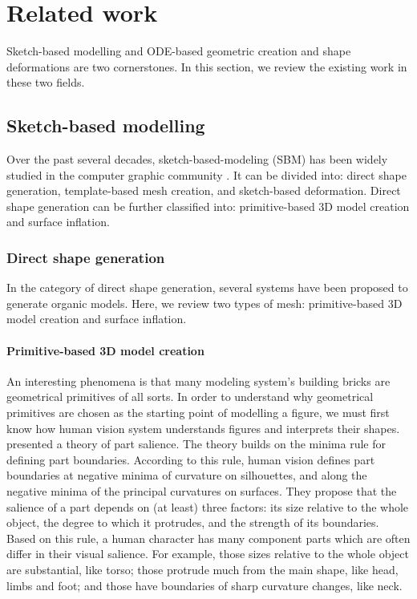 \documentclass[runningheads]{llncs}
\begin{document}
\section{Related work}\label{related work}
Sketch-based modelling and ODE-based geometric creation and shape deformations are two cornerstones. In this section, we review the existing work in these two fields.\\

\subsection{Sketch-based modelling}
Over the past several decades, sketch-based-modeling (SBM) has been widely studied in the computer graphic community \cite{olsen2009sketch}. It can be divided into: direct shape generation, template-based mesh creation, and sketch-based deformation. Direct shape generation can be further classified into: primitive-based 3D model creation and surface inflation.

\subsubsection{Direct shape generation} In the category of direct shape generation, several systems have been proposed to generate organic models. Here, we review two types of mesh: primitive-based 3D model creation and surface inflation.


\paragraph{Primitive-based 3D model creation}
An interesting phenomena is that many modeling system's building bricks are geometrical primitives of all sorts. In order to understand why geometrical primitives are chosen as the starting point of modelling a figure, we must first know how human vision system understands figures and interprets their shapes. \cite{hoffman1997salience} presented a theory of part salience. The theory builds on the minima rule for defining part boundaries. According to this rule, human vision defines part boundaries at negative minima of curvature on silhouettes, and along the negative minima of the principal curvatures on surfaces. They propose that the salience of a part depends on (at least) three factors: its size relative to the whole object, the degree to which it protrudes, and the strength of its boundaries. Based on this rule, a human character has many component parts which are often differ in their visual salience. For example, those sizes relative to the whole object are substantial, like torso; those protrude much from the main shape, like head, limbs and foot; and those have boundaries of sharp curvature changes, like neck.\\
\end{document}
